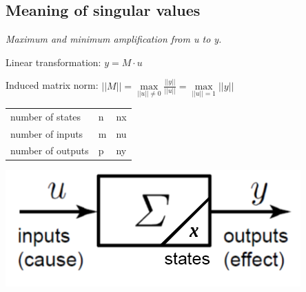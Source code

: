 \documentclass[10pt,a4paper]{scrartcl}
\begin{document}
\begin{multicols*}{3}
	
	
	
	\finn
	
	
	\subsection*{Meaning of singular values}
	
	\emph{Maximum and minimum amplification from u to y.}
	
	Linear transformation: $y=M\cdot u$
	
	Induced matrix norm: $||M||=\max\limits_{||u||\neq 0}\frac{||y||}{||u||}=\max\limits_{||u||=1}||y||$
	
	
	
	\vspace{3ex}	
	
	\setlength{\columnseprule}{0pt}
	\small
	\begin{multicols*}{2}
	\begin{tabular}{ll@{=}l}
	number of states&n&nx\\
	number of inputs&m&nu\\
	number of outputs&p&ny\\
	\end{tabular}
	\normalsize
	\includegraphics[width=\linewidth]{Signal1}
	\end{multicols*}
	\setlength{\columnseprule}{0.5pt}	
	

\end{multicols*}
\end{document}
